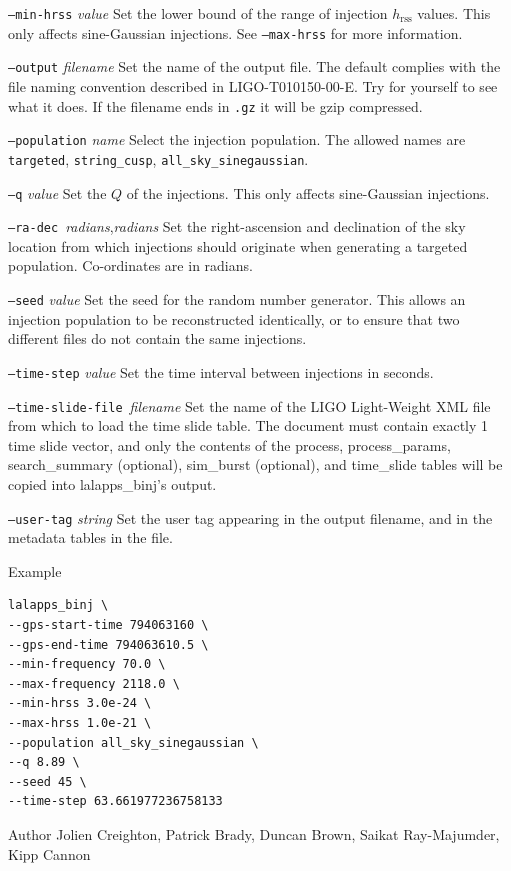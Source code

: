 \documentclass[10pt]{article}
\newcommand{\option}[1]{\texttt{#1}}
\newcommand{\parm}[1]{\textit{#1}}
\newenvironment{entry}%
{\begin{list}{}{\renewcommand{\makelabel}[1]%
{\parbox[b]{\labelwidth}{\makebox[0pt][l]{\textbf{##1}}\\}}%
\setlength{\labelwidth}{1em}%
\setlength{\labelsep}{1em}%
\setlength{\leftmargin}{2em}%
\setlength{\topsep}{\medskipamount}%
\setlength{\itemsep}{\medskipamount}%
\setlength{\parsep}{\medskipamount}%
\setlength{\listparindent}{0pt}}}
{\end{list}}
\begin{document}
\begin{entry}
\begin{entry}
\item[\option{--min-hrss} \parm{value}]
Set the lower bound of the range of injection \(h_{\text{rss}}\) values.
This only affects sine-Gaussian injections.  See \option{--max-hrss} for
more information.

\item[\option{--output} \parm{filename}]
Set the name of the output file.  The default complies with the file naming
convention described in LIGO-T010150-00-E.  Try for yourself to see what it
does.  If the filename ends in \texttt{.gz} it will be gzip compressed.

\item[\option{--population} \parm{name}]
Select the injection population.  The allowed names are \option{targeted},
\option{string\_cusp}, \option{all\_sky\_sinegaussian}.

\item[\option{--q} \parm{value}]
Set the \(Q\) of the injections.  This only affects sine-Gaussian
injections.

\item[\option{--ra-dec}~\parm{radians},\parm{radians}]
Set the right-ascension and declination of the sky location from which
injections should originate when generating a targeted population.
Co-ordinates are in radians.

\item[\option{--seed} \parm{value}]
Set the seed for the random number generator.  This allows an injection
population to be reconstructed identically, or to ensure that two different
files do not contain the same injections.

\item[\option{--time-step} \parm{value}]
Set the time interval between injections in seconds.

\item[\option{--time-slide-file}~\parm{filename}]
Set the name of the LIGO Light-Weight XML file from which to load the time
slide table.  The document must contain exactly 1 time slide vector, and
only the contents of the process, process\_params, search\_summary
(optional), sim\_burst (optional), and time\_slide tables will be copied
into lalapps\_binj's output.

\item[\option{--user-tag} \parm{string}]
Set the user tag appearing in the output filename, and in the metadata
tables in the file.

\end{entry}

\item[Example]
\begin{verbatim}
lalapps_binj \
--gps-start-time 794063160 \
--gps-end-time 794063610.5 \
--min-frequency 70.0 \
--max-frequency 2118.0 \
--min-hrss 3.0e-24 \
--max-hrss 1.0e-21 \
--population all_sky_sinegaussian \
--q 8.89 \
--seed 45 \
--time-step 63.661977236758133
\end{verbatim}

\item[Author] 
Jolien Creighton, Patrick Brady, Duncan Brown, Saikat Ray-Majumder, Kipp
Cannon
\end{entry}
\end{document}

